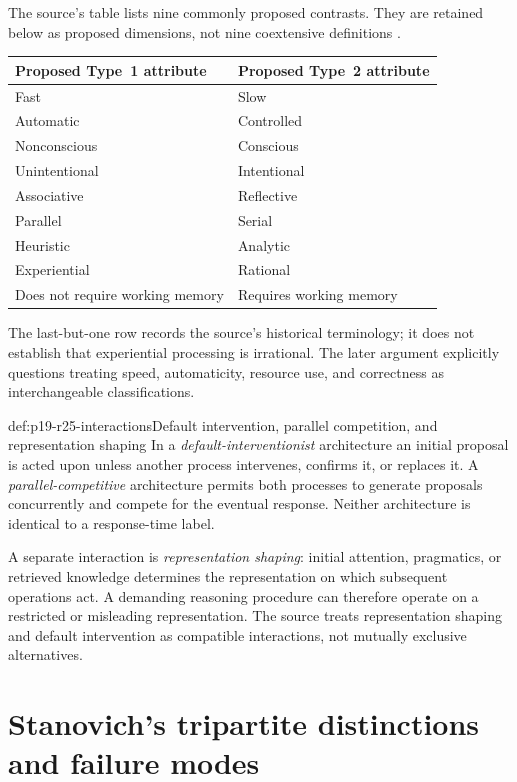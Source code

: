 The source's table lists nine commonly proposed contrasts. They are
retained below as proposed dimensions, not nine coextensive definitions
\cite[table~2.5.1, p.~174]{Klauer2021DualProcess}.
\begin{center}
\begin{tabular}{ll}
\toprule
Proposed Type~1 attribute & Proposed Type~2 attribute\\
\midrule
Fast & Slow\\
Automatic & Controlled\\
Nonconscious & Conscious\\
Unintentional & Intentional\\
Associative & Reflective\\
Parallel & Serial\\
Heuristic & Analytic\\
Experiential & Rational\\
Does not require working memory & Requires working memory\\
\bottomrule
\end{tabular}
\end{center}
The last-but-one row records the source's historical terminology;
it does not establish that experiential processing is irrational.
The later argument explicitly questions treating speed, automaticity,
resource use, and correctness as interchangeable classifications.

\begin{hbdefinition}{def:p19-r25-interactions}{Default intervention, parallel competition, and representation shaping}
In a \emph{default-interventionist} architecture an initial proposal
is acted upon unless another process intervenes, confirms it, or replaces
it. A \emph{parallel-competitive} architecture permits both processes
to generate proposals concurrently and compete for the eventual response.
Neither architecture is identical to a response-time label.

A separate interaction is \emph{representation shaping}: initial attention,
pragmatics, or retrieved knowledge determines the representation on which
subsequent operations act. A demanding reasoning procedure can therefore
operate on a restricted or misleading representation. The source treats
representation shaping and default intervention as compatible interactions,
not mutually exclusive alternatives.
\end{hbdefinition}

\section{Stanovich's tripartite distinctions and failure modes}

